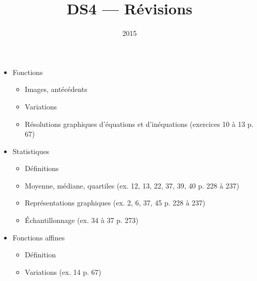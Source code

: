 \documentclass[12pt, aspectratio=43]{beamer}
\institute{Lycée Marie Curie}
\date{2015}
\title{DS4 --- Révisions}
\begin{document}
\begin{frame}

  \begin{itemize}
    \item Fonctions
      \begin{itemize}
        \item Images, antécédents
        \item Variations
        \item Résolutions graphiques d'équations et d'inéquations (exercices 10 à 13 p. 67)
      \end{itemize}
    \item Statistiques
      \begin{itemize}
        \item Définitions
        \item Moyenne, médiane, quartiles (ex. 12, 13, 22, 37, 39, 40 p. 228 à 237)
        \item Représentations graphiques (ex. 2, 6, 37, 45 p. 228 à 237)
        \item Échantillonnage (ex. 34 à 37 p. 273)
      \end{itemize}
    \item Fonctions affines
      \begin{itemize}
        \item Définition
        \item Variations (ex. 14 p. 67)
      \end{itemize}
  \end{itemize}
\end{frame}
\end{document}

